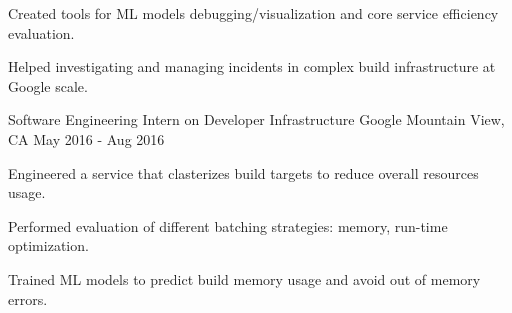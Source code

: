 \begin{cventries}
{\begin{cvitems}
        \item {Created tools for ML models debugging/visualization and core service efficiency evaluation.}
        \item {Helped investigating and managing incidents in complex build infrastructure at Google scale.}
      \end{cvitems}
    }
  \cventry
    {Software Engineering Intern on Developer Infrastructure} %
    {Google} %
    {Mountain View, CA} %
    {May 2016 - Aug 2016} %
    {
      \begin{cvitems} %
        \item {Engineered a service that clasterizes build targets to reduce overall resources usage.}
        \item {Performed evaluation of different batching strategies: memory, run-time optimization.}
        \item {Trained ML models to predict build memory usage and avoid out of memory errors.}
      \end{cvitems}
    }
\end{cventries}
